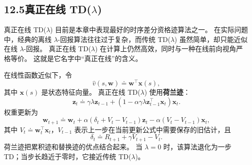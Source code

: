 \documentclass[UTF8,12pt,a4paper,fontset=fandol]{ctexart}
\begin{document}
\subsection*{12.5\quad 真正在线 TD($\lambda$)}

真正在线 TD($\lambda$) 目前是本章中表现最好的时序差分资格迹算法之一。
在实际问题中，经典的离线 $\lambda$-回报算法往往过于复杂，而传统 TD($\lambda$) 虽然简单，却只能近似在线 $\lambda$-回报。
真正在线 TD($\lambda$) 在计算上仍然高效，同时与一种在线前向视角严格等价。
这就是它名字中“真正在线”的含义。

在线性函数近似下，令
\[
\hat v(s,\mathbf{w})\doteq \mathbf{w}^{\top}\mathbf{x}(s),
\]
其中 $\mathbf{x}(s)$ 是状态特征向量。
真正在线 TD($\lambda$) 使用\textbf{荷兰迹}：
\begin{equation}
\mathbf{z}_t\doteq \gamma\lambda\mathbf{z}_{t-1}
+\left(1-\alpha\gamma\lambda\mathbf{z}_{t-1}^{\top}\mathbf{x}_t\right)\mathbf{x}_t.
\tag{12.9}
\end{equation}
权重更新为
\begin{equation}
\mathbf{w}_{t+1}\doteq \mathbf{w}_t+\alpha(\delta_t+V_t-V_{t-1})\mathbf{z}_t
-\alpha(V_t-V_{t-1})\mathbf{x}_t,
\tag{12.10}
\end{equation}
其中 $V_t\doteq\mathbf{w}_t^\top\mathbf{x}_t$，$V_{t-1}$ 表示上一步在当前更新公式中需要保存的旧估计，且
\[
\delta_t\doteq R_{t+1}+\gamma V_{t+1}-V_t.
\]
荷兰迹把累积迹和替换迹的优点结合起来。
当 $\lambda=0$ 时，该算法退化为一步 TD；当步长趋近于零时，它接近传统 TD($\lambda$)。
\end{document}
